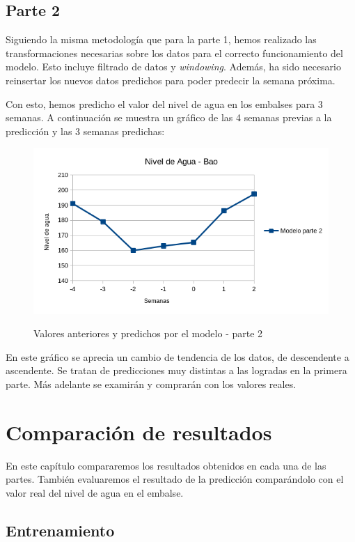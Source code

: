 \documentclass[12pt]{report} %
\begin{document}
\section{Parte 2}

Siguiendo la misma metodología que para la parte 1, hemos realizado las transformaciones necesarias sobre los datos para el correcto funcionamiento del modelo. Esto incluye filtrado de datos y \textit{windowing}. Además, ha sido necesario reinsertar los nuevos datos predichos para poder predecir la semana próxima.

Con esto, hemos predicho el valor del nivel de agua en los embalses para 3 semanas. A continuación se muestra un gráfico de las 4 semanas previas a la predicción y las 3 semanas predichas:

\begin{figure}[H]
    \includegraphics[width=\linewidth]{predict-2-bao.png}\\
    \caption{\small Valores anteriores y  predichos por el modelo - parte 2}
\end{figure}

En este gráfico se aprecia un cambio de tendencia de los datos, de descendente a ascendente. Se tratan de predicciones muy distintas a las logradas en la primera parte. Más adelante se examirán y comprarán con los valores reales.

\chapter{Comparación de resultados}
\label{chap:result-comparing}
En este capítulo compararemos los resultados obtenidos en cada una de las partes. También evaluaremos el resultado de la predicción comparándolo con el valor real del nivel de agua en el embalse.

\section{Entrenamiento}
\end{document}
